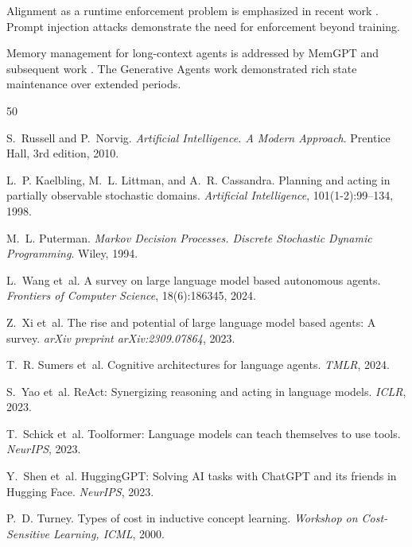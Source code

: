 Alignment as a runtime enforcement problem is emphasized in recent work \cite{perez2022red, ganguli2022red, wei2024jailbroken}. Prompt injection attacks \cite{perez2022ignore, greshake2023youve, zhan2024injecagent} demonstrate the need for enforcement beyond training.

Memory management for long-context agents is addressed by MemGPT \cite{packer2023memgpt} and subsequent work \cite{zhang2024survey}. The Generative Agents work \cite{park2023generative} demonstrated rich state maintenance over extended periods.

\begin{thebibliography}{50}

S.~Russell and P.~Norvig.
\newblock \emph{Artificial Intelligence. A Modern Approach}.
\newblock Prentice Hall, 3rd edition, 2010.

L.~P. Kaelbling, M.~L. Littman, and A.~R. Cassandra.
\newblock Planning and acting in partially observable stochastic domains.
\newblock \emph{Artificial Intelligence}, 101(1-2):99--134, 1998.

M.~L. Puterman.
\newblock \emph{Markov Decision Processes. Discrete Stochastic Dynamic Programming}.
\newblock Wiley, 1994.

L.~Wang et~al.
\newblock A survey on large language model based autonomous agents.
\newblock \emph{Frontiers of Computer Science}, 18(6):186345, 2024.

Z.~Xi et~al.
\newblock The rise and potential of large language model based agents: A survey.
\newblock \emph{arXiv preprint arXiv:2309.07864}, 2023.

T.~R. Sumers et~al.
\newblock Cognitive architectures for language agents.
\newblock \emph{TMLR}, 2024.

S.~Yao et~al.
\newblock ReAct: Synergizing reasoning and acting in language models.
\newblock \emph{ICLR}, 2023.

T.~Schick et~al.
\newblock Toolformer: Language models can teach themselves to use tools.
\newblock \emph{NeurIPS}, 2023.

Y.~Shen et~al.
\newblock HuggingGPT: Solving AI tasks with ChatGPT and its friends in Hugging Face.
\newblock \emph{NeurIPS}, 2023.

P.~D. Turney.
\newblock Types of cost in inductive concept learning.
\newblock \emph{Workshop on Cost-Sensitive Learning, ICML}, 2000.


\end{thebibliography}

